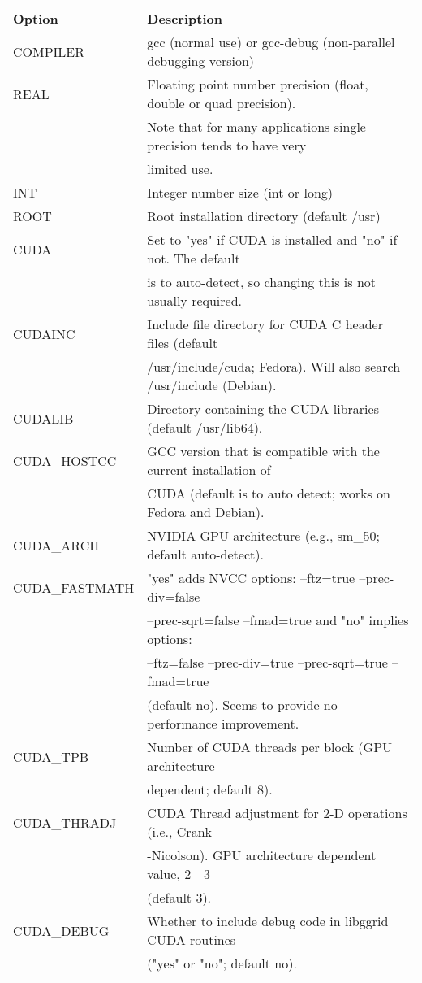 \documentclass[12pt,letterpaper]{report}
\begin{document}
\begin{tabular}{ll}
\textbf{Option} & \textbf{Description}\\
\cline{1-2}
COMPILER & gcc (normal use) or gcc-debug (non-parallel debugging version)\\
REAL & Floating point number precision (float, double or quad precision).\\
     & Note that for many applications single precision tends to have very\\
     & limited use.\\
INT & Integer number size (int or long)\\
ROOT & Root installation directory (default /usr)\\
CUDA & Set to "yes" if CUDA is installed and "no" if not. The default\\
     & is to auto-detect, so changing this is not usually required.\\
CUDAINC & Include file directory for CUDA C header files (default\\
        & /usr/include/cuda; Fedora). Will also search /usr/include (Debian).\\
CUDALIB & Directory containing the CUDA libraries (default /usr/lib64).\\
CUDA\_HOSTCC & GCC version that is compatible with the current installation of\\
             & CUDA (default is to auto detect; works on Fedora and Debian).\\
CUDA\_ARCH & NVIDIA GPU architecture (e.g., sm\_50; default auto-detect).\\
CUDA\_FASTMATH & "yes" adds NVCC options: --ftz=true --prec-div=false\\
               & --prec-sqrt=false --fmad=true and "no" implies options:\\
               & --ftz=false --prec-div=true --prec-sqrt=true --fmad=true\\
               & (default no). Seems to provide no performance improvement.\\
CUDA\_TPB & Number of CUDA threads per block (GPU architecture\\
          & dependent; default 8).\\
CUDA\_THRADJ & CUDA Thread adjustment for 2-D operations (i.e., Crank\\
             & -Nicolson). GPU architecture dependent value, 2 - 3\\
             & (default 3).\\
CUDA\_DEBUG & Whether to include debug code in libggrid CUDA routines\\
            & ("yes" or "no"; default no).\\
\end{tabular}
\end{document}
